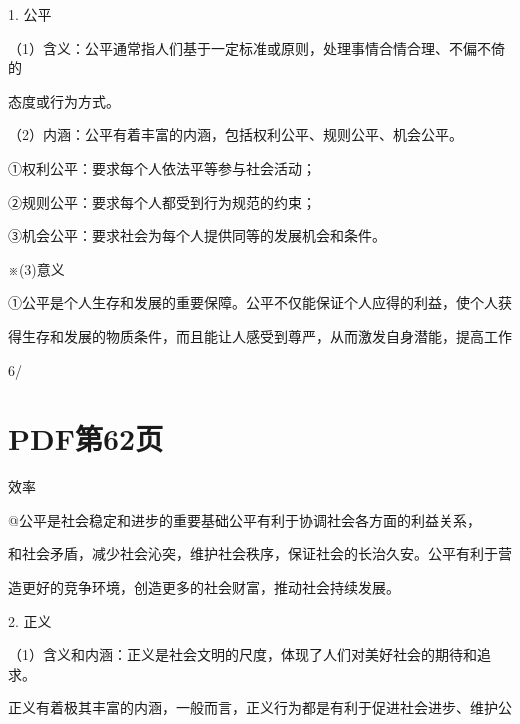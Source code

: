 \documentclass[lang=cn,11pt]{elegantbook}
\newcommand{\daofasym}[1]{{\daofasymbolfont #1}}
\newcommand{\daofasym}[1]{#1}
\begin{document}
1. 公平\par

（1）含义：公平通常指人们基于一定标准或原则，处理事情合情合理、不偏不倚的\par

态度或行为方式。\par

（2）内涵：公平有着丰富的内涵，包括权利公平、规则公平、机会公平。\par

\daofasym{①}权利公平：要求每个人依法平等参与社会活动；\par

\daofasym{②}规则公平：要求每个人都受到行为规范的约束；\par

\daofasym{③}机会公平：要求社会为每个人提供同等的发展机会和条件。\par

※(3)意义\par

\daofasym{①}公平是个人生存和发展的重要保障。公平不仅能保证个人应得的利益，使个人获\par

得生存和发展的物质条件，而且能让人感受到尊严，从而激发自身潜能，提高工作\par

6/\par


\section*{PDF第62页}

效率\par

@公平是社会稳定和进步的重要基础公平有利于协调社会各方面的利益关系，\par

和社会矛盾，减少社会沁突，维护社会秩序，保证社会的长治久安。公平有利于营\par

造更好的竞争环境，创造更多的社会财富，推动社会持续发展。\par

2. 正义\par

（1）含义和内涵：正义是社会文明的尺度，体现了人们对美好社会的期待和追求。\par

正义有着极其丰富的内涵，一般而言，正义行为都是有利于促进社会进步、维护公\par
\end{document}
